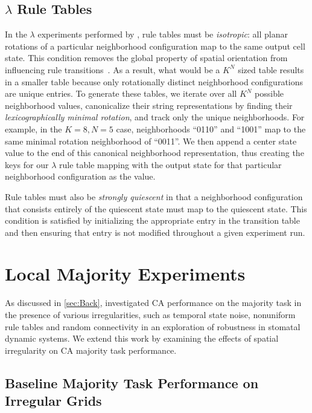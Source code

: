 \documentclass[a4paper,11pt]{article}
\begin{document}
\subsection{$\lambda$ Rule Tables}
\label{subsec:ch3_lamb}
In the $\lambda$ experiments performed by \citeauthor{wo90}, rule tables must be \textit{isotropic}: all planar rotations of a particular neighborhood configuration map to the same output cell state. This condition removes the global property of spatial orientation from influencing rule transitions~\cite{av00,wo90}. As a result, what would be a $K^N$ sized table results in a smaller table because only rotationally distinct neighborhood configurations are unique entries. To generate these tables, we iterate over all $K^N$ possible neighborhood values, canonicalize their string representations by finding their \textit{lexicographically minimal rotation}, and track only the unique neighborhoods. For example, in the $K=8, N=5$ case, neighborhoods ``0110'' and ``1001'' map to the same minimal rotation neighborhood of ``0011''. We then append a center state value to the end of this canonical neighborhood representation, thus creating the keys for our $\lambda$ rule table mapping with the output state for that particular neighborhood configuration as the value.

Rule tables must also be \textit{strongly quiescent} in that a neighborhood configuration that consists entirely of the quiescent state must map to the quiescent state. This condition is satisfied by initializing the appropriate entry in the transition table and then ensuring that entry is not modified throughout a given experiment run.


\section{Local Majority Experiments}
\label{sec:local_maj}

As discussed in \ref{sec:Back}, \citeauthor{me07} investigated CA performance on the majority task in the presence of various irregularities, such as temporal state noise, nonuniform rule tables and random connectivity in an exploration of robustness in stomatal dynamic systems. We extend this work by examining the effects of spatial irregularity on CA majority task performance.

\subsection{Baseline Majority Task Performance on Irregular Grids}
\end{document}
